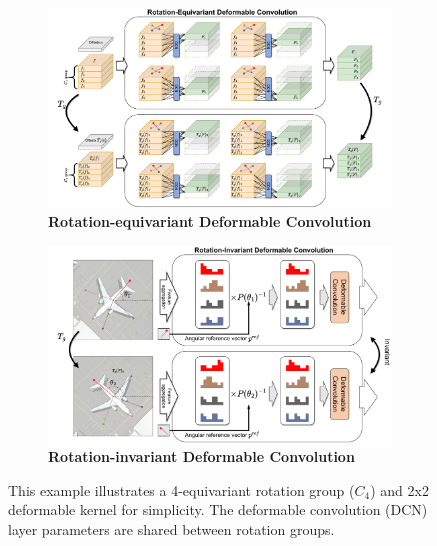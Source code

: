\documentclass[letterpaper]{article} %
\begin{document}
\begin{figure}[t]
    \begin{subfigure}{.5\textwidth}
    \centering
    \includegraphics[width=0.9\linewidth]{figs/re-dcn.pdf}
    \caption{\textbf{Rotation-equivariant Deformable Convolution}}
    \label{fig:figure3a}
    \end{subfigure}
    \begin{subfigure}{.5\textwidth}
    \centering
    \includegraphics[width=0.9\linewidth]{figs/ri-dcn.pdf}
    \caption{\textbf{Rotation-invariant Deformable Convolution}}
    \label{fig:figure3b}
    \end{subfigure}
\caption{This example illustrates a 4-equivariant rotation group ($C_4$) and 2x2 deformable kernel for simplicity. The deformable convolution (DCN) layer parameters are shared between rotation groups.}
\label{fig4}
\end{figure}
\end{document}
